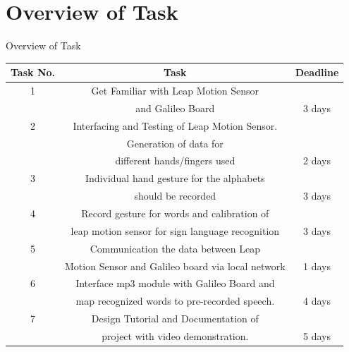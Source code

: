\documentclass[10pt, a4paper]{beamer}
\begin{document}
\section{Overview of Task}
\begin{frame}{Overview of Task}
\hspace{-21px}
\begin{tabular}{c|c|c}
    \hline
    Task No.&Task&Deadline\\
    \hline
    1&Get Familiar with Leap Motion Sensor&\\& and Galileo Board&3 days\\
    \hline
    2&Interfacing and Testing of Leap Motion Sensor.&\\
    &Generation of data for&\\& different hands/fingers used&2 days\\
    \hline
    3&Individual hand gesture for the alphabets &\\&should be recorded&3 days\\
    \hline
    4&Record gesture for words and calibration of &\\&leap motion sensor for sign language recognition&3 days\\
    \hline
    5&Communication the data between Leap  &\\&Motion Sensor and Galileo  board via local network&1 days\\
    \hline
    6&Interface mp3 module with  Galileo Board and&\\& map recognized words to pre-recorded  speech.&4 days\\
    \hline
    7&Design Tutorial and Documentation of&\\& project with video demonstration.&5 days\\
\end{tabular}
\end{frame}
\end{document}
